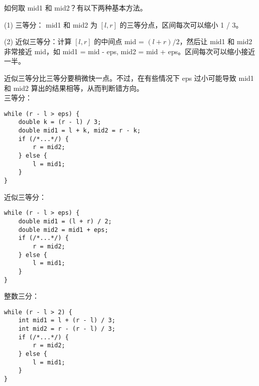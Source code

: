 如何取 mid1 和 mid2？有以下两种基本方法。

(1) 三等分： mid1 和 mid2 为 $[l, r]$ 的三等分点，区间每次可以缩小 1 / 3。

(2) 近似三等分：计算 $[l, r]$ 的中间点 mid = $(l + r) / 2$，然后让 mid1 和 mid2 非常接近 mid，如 mid1 = mid - eps, mid2 = mid + eps。区间每次可以缩小接近一半。

近似三等分比三等分要稍微快一点。不过，在有些情况下 eps 过小可能导致 mid1 和 mid2 算出的结果相等，从而判断错方向。
\\

三等分：
\begin{lstlisting}
while (r - l > eps) {
	double k = (r - l) / 3;
	double mid1 = l + k, mid2 = r - k;
	if (/*...*/) {
		r = mid2;
	} else {
		l = mid1;
	}
}
\end{lstlisting}

近似三等分：
\begin{lstlisting}
while (r - l > eps) {
	double mid1 = (l + r) / 2;
	double mid2 = mid1 + eps;
	if (/*...*/) {
		r = mid2;
	} else {
		l = mid1;
	}
}
\end{lstlisting}

整数三分：
\begin{lstlisting}
while (r - l > 2) {
	int mid1 = l + (r - l) / 3;
	int mid2 = r - (r - l) / 3;
	if (/*...*/) {
		r = mid2;
	} else {
		l = mid1;
	}
}
\end{lstlisting}